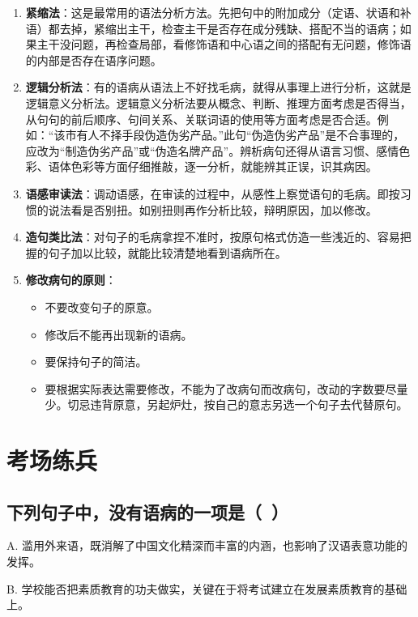 \begin{enumerate}[leftmargin=*]
    \item \textbf{紧缩法}：这是最常用的语法分析方法。先把句中的附加成分（定语、状语和补语）都去掉，紧缩出主干，检查主干是否存在成分残缺、搭配不当的语病；如果主干没问题，再检查局部，看修饰语和中心语之间的搭配有无问题，修饰语的内部是否存在语序问题。
    \item \textbf{逻辑分析法}：有的语病从语法上不好找毛病，就得从事理上进行分析，这就是逻辑意义分析法。逻辑意义分析法要从概念、判断、推理方面考虑是否得当，从句句的前后顺序、句间关系、关联词语的使用等方面考虑是否合适。例如：“该市有人不择手段伪造伪劣产品。”此句“伪造伪劣产品”是不合事理的，应改为“制造伪劣产品”或“伪造名牌产品”。辨析病句还得从语言习惯、感情色彩、语体色彩等方面仔细推敲，逐一分析，就能辨其正误，识其病因。
    \item \textbf{语感审读法}：调动语感，在审读的过程中，从感性上察觉语句的毛病。即按习惯的说法看是否别扭。如别扭则再作分析比较，辩明原因，加以修改。
    \item \textbf{造句类比法}：对句子的毛病拿捏不准时，按原句格式仿造一些浅近的、容易把握的句子加以比较，就能比较清楚地看到语病所在。
    \item \textbf{修改病句的原则}：
        \begin{itemize}
            \item 不要改变句子的原意。
            \item 修改后不能再出现新的语病。
            \item 要保持句子的简洁。
            \item 要根据实际表达需要修改，不能为了改病句而改病句，改动的字数要尽量少。切忌违背原意，另起炉灶，按自己的意志另选一个句子去代替原句。
        \end{itemize}
\end{enumerate}

\section{考场练兵}

\subsection{下列句子中，没有语病的一项是（\ ）}

A. 滥用外来语，既消解了中国文化精深而丰富的内涵，也影响了汉语表意功能的发挥。

B. 学校能否把素质教育的功夫做实，关键在于将考试建立在发展素质教育的基础上。

